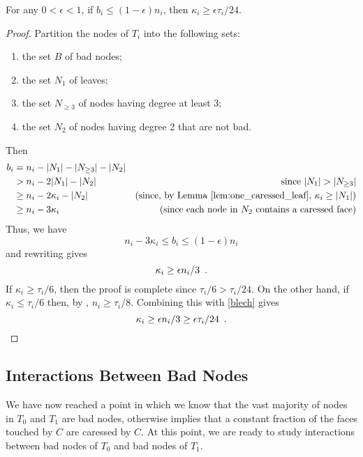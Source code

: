 \documentclass{patmorin}
\begin{document}
\begin{lem}
   For any $0<\epsilon < 1$, if $b_i \le (1-\epsilon)n_i$, then
   $\kappa_i \ge \epsilon\tau_i/24$.
\end{lem}

\begin{proof}
   Partition the nodes of $T_i$ into the following sets:
   \begin{enumerate}
       \item the set $B$ of bad nodes;
       \item the set $N_1$ of leaves;
       \item the set $N_{\ge 3}$ of nodes having degree at least 3;
       \item the set $N_2$ of nodes having degree 2 that are not bad.
   \end{enumerate}
   Then
   \begin{align*}
     b_i & = n_i - |N_1|- |N_{\ge 3}|-|N_2| \\
	   & > n_i - 2|N_1|-|N_2| & \text{since $|N_1|> |N_{\ge 3}|$} \\
         & \ge  n_i - 2\kappa_i -|N_2|
	   & \text{(since, by \lemref{one_caressed_leaf}, $\kappa_i\ge |N_1|$)} \\
           & \ge  n_i - 3\kappa_i
           & \text{(since each node in $N_2$ contains a caressed face)}
    \end{align*}
    Thus, we have
    \[
          n_i-3\kappa_i \le b_i \le (1-\epsilon)n_i
    \]
    and rewriting gives
    \begin{equation}
      \kappa_i \ge \epsilon n_i/3 \enspace . \eqlabel{blech}
    \end{equation}
    If $\kappa_i \ge \tau_i/6$, then the proof is complete since $\tau_i/6>\tau_i/24$.  On the other hand, if $\kappa_i \le \tau_i/6$ then, by , $n_i \ge \tau_i/8$. Combining this with \eqref{blech}  gives
    \[
      \kappa_i \ge \epsilon n_i/3 \ge \epsilon\tau_i/24  \enspace . \qedhere
    \]
\end{proof}

\subsection{Interactions Between Bad Nodes}

We have now reached a point in which we know that the vast
majority of nodes in $T_0$ and $T_1$ are bad nodes, otherwise
 implies that a constant fraction of the
faces touched by $C$ are caressed by $C$.  At this point, we are ready
to study interactions between bad nodes of $T_0$ and bad nodes of $T_1$.
\end{document}
